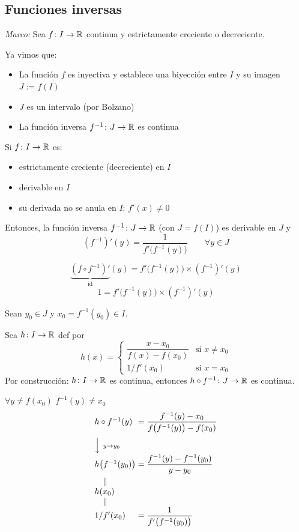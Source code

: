 \documentclass[11pt,a4paper]{article}
\begin{document}
\subsection{Funciones inversas}

\textit{Marco:} Sea $f\colon I\to\mathbb{R}$ continua y estrictamente creciente o
decreciente.

Ya vimos que:
\begin{itemize}
  \item[--] La función $f$ es inyectiva y establece una biyección entre $I$
    y su imagen $J:=f(I)$
  \item[--] $J$ es un intervalo (por Bolzano)
  \item[--] La función inversa $f^{-1}\colon J\to\mathbb{R}$ es continua
\end{itemize}

\begin{proposicion}
  Si $f\colon I\to\mathbb{R}$ es:
  \begin{itemize}
    \item[--] estrictamente creciente (decreciente) en $I$
    \item[--] derivable en $I$
    \item[--] su derivada no se anula en $I$: $f'(x)\neq 0$
  \end{itemize}
  Entonces, la función inversa $f^{-1}\colon J\to\mathbb{R}$ (con $J=f(I)$) es
  derivable en $J$ y
  \[
    (f^{-1})'(y)=\frac{1}{f'\bigl(f^{-1}(y)\bigr)}\qquad\forall y\in J
  \]
\end{proposicion}

\[
  \underbrace{(f\circ f^{-1})'}_{\text{id}}(y)
  =f'\bigl(f^{-1}(y)\bigr)\times(f^{-1})'(y)
\]
\[
  1=f'\bigl(f^{-1}(y)\bigr)\times(f^{-1})'(y)
\]

\begin{demo}
  Sean $y_0\in J$ y $x_0=f^{-1}(y_0)\in I$.

  Sea $h\colon I\to\mathbb{R}$ def por
  \[
    h(x)=\begin{cases}
      \dfrac{x-x_0}{f(x)-f(x_0)} & \text{si } x\neq x_0\\[2ex]
      1/f'(x_0) & \text{si } x=x_0
    \end{cases}
  \]
  Por construcción: $h\colon I\to\mathbb{R}$ es continua, entonces
  $h\circ f^{-1}\colon J\to\mathbb{R}$ es continua.

  $\forall y\neq f(x_0)$ \qquad $f^{-1}(y)\neq x_0$
  \[
    \begin{array}{l@{\;}l}
      h\circ f^{-1}(y) & =\dfrac{f^{-1}(y)-x_0}{f\bigl(f^{-1}(y)\bigr)-f(x_0)}\\[3ex]
      \Big\downarrow\rlap{$\scriptstyle\ y\to y_0$} & \\[1ex]
      h\bigl(f^{-1}(y_0)\bigr) & =\dfrac{f^{-1}(y)-f^{-1}(y_0)}{y-y_0}\\[2ex]
      \quad\| & \\
      h(x_0) & \\
      \quad\| & \\
      1/f'(x_0) & =\dfrac{1}{f'\bigl(f^{-1}(y_0)\bigr)}
    \end{array}
  \]
\end{demo}
\end{document}
